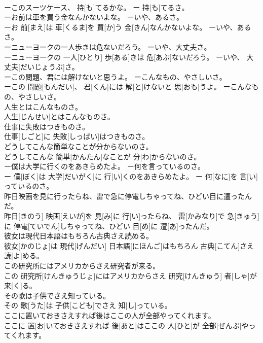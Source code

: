 \documentclass[8pt]{extreport}
\begin{document}
\begin{CJK}{UTF8}{min}
\\	ーこのスーツケース、 持[も]てるかな。 ー 持[も]てるさ。
\\	ーお前は車を買う金なんかないよな。 ーいや、あるさ。	
\\	ーお 前[まえ]は 車[くるま]を 買[か]う 金[きん]なんかないよな。 ーいや、あるさ。
\\	ーニューヨークの一人歩きは危ないだろう。 ーいや、大丈夫さ。	
\\	ーニューヨークの 一人[ひとり] 歩[ある]きは 危[あぶ]ないだろう。 ーいや、 大丈夫[だいじょうぶ]さ。
\\	ーこの問題、君には解けないと思うよ。 ーこんなもの、やさしいさ。	
\\	ーこの 問題[もんだい]、 君[くん]には 解[と]けないと 思[おも]うよ。 ーこんなもの、やさしいさ。
\\	人生とはこんなものさ。	
\\	人生[じんせい]とはこんなものさ。
\\	仕事に失敗はつきものさ。	
\\	仕事[しごと]に 失敗[しっぱい]はつきものさ。
\\	どうしてこんな簡単なことが分からないのさ。	
\\	どうしてこんな 簡単[かんたん]なことが 分[わ]からないのさ。
\\	ー僕は大学に行くのをあきらめたよ。 ー何を言っているのさ。	
\\	ー 僕[ぼく]は 大学[だいがく]に 行[い]くのをあきらめたよ。 ー 何[なに]を 言[い]っているのさ。
\\	昨日映画を見に行ったらね、雷で急に停電しちゃってね、ひどい目に遭ったんだ。	
\\	昨日[きのう] 映画[えいが]を 見[み]に 行[い]ったらね、 雷[かみなり]で 急[きゅう]に 停電[ていでん]しちゃってね、ひどい 目[め]に 遭[あ]ったんだ。
\\	彼女は現代日本語はもちろん古典さえ読める。	
\\	彼女[かのじょ]は 現代[げんだい] 日本語[にほんご]はもちろん 古典[こてん]さえ 読[よ]める。
\\	この研究所にはアメリカからさえ研究者が来る。	
\\	この 研究所[けんきゅうじょ]にはアメリカからさえ 研究[けんきゅう] 者[しゃ]が 来[く]る。
\\	その歌は子供でさえ知っている。	
\\	その 歌[うた]は 子供[こども]でさえ 知[し]っている。
\\	ここに置いておきさえすれば後はここの人が全部やってくれます。	
\\	ここに 置[お]いておきさえすれば 後[あと]はここの 人[ひと]が 全部[ぜんぶ]やってくれます。

\end{CJK}
\end{document}
